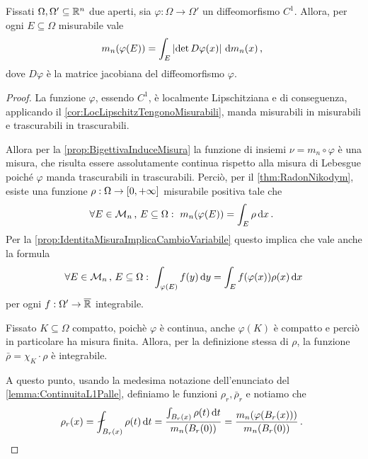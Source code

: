 \begin{lemma}\label{lemma:MisuraImmagine}
	Fissati $\Omega,\Omega'\subseteq\mathbb R^n$ due aperti, sia $\varphi:\Omega\to\Omega'$ un diffeomorfismo $C^1$.
	Allora, per ogni $E\subseteq \Omega$ misurabile vale
	\begin{equation*}
		m_n(\varphi(E))=\int_E\left\lvert \det D\varphi(x) \right\rvert \,\mathrm d m_n(x)\, \text{, }
	\end{equation*}
	dove $D\varphi$ è la matrice jacobiana del diffeomorfismo $\varphi$.
\end{lemma}
\begin{proof}
	La funzione $\varphi$, essendo $C^1$, è localmente Lipschitziana e di conseguenza, applicando il \cref{cor:LocLipschitzTengonoMisurabili}, manda misurabili in misurabili e trascurabili in trascurabili.
	
	Allora per la \cref{prop:BigettivaInduceMisura} la funzione di insiemi $\nu=m_n\circ \varphi$ è una misura, che risulta essere assolutamente continua rispetto alla misura di Lebesgue poiché $\varphi$ manda trascurabili in trascurabili.
	Perciò, per il \cref{thm:RadonNikodym}, esiste una funzione $\rho:\Omega\to[0,+\infty]$ misurabile positiva tale che
	\begin{equation*}
		\forall E\in \mathcal M_n\, \text{, } E\subseteq \Omega:\ m_n(\varphi(E))=\int_E \rho \,\mathrm d x \, \text{. }
	\end{equation*}
	Per la \cref{prop:IdentitaMisuraImplicaCambioVariabile} questo implica che vale anche la formula
	\begin{equation}\label{eq:CambioRadonNikodym}
		\forall E\in \mathcal M_n\, \text{, } E\subseteq\Omega:\ \int_{\varphi(E)} f(y)\,\mathrm d y = \int_{E} f(\varphi(x))\rho(x) \,\mathrm d x
	\end{equation}
	per ogni $f:\Omega'\to\overline{\mathbb R}$ integrabile.
	
	Fissato $K\subseteq\Omega$ compatto, poichè $\varphi$ è continua, anche $\varphi(K)$ è compatto e perciò in particolare ha misura finita.
	Allora, per la definizione stessa di $\rho$, la funzione $\bar\rho=\chi_K\cdot\rho$ è integrabile.
	
	A questo punto, usando la medesima notazione dell'enunciato del \cref{lemma:ContinuitaL1Palle}, definiamo le funzioni $\rho_r, \bar\rho_r$ e notiamo che
	\begin{equation*}
		\rho_r(x)=\aint_{B_r(x)}\rho(t)\de t=\frac{\int_{B_r(x)} \rho(t)\de t}{m_n(B_r(0))}=\frac{m_n(\varphi(B_r(x)))}{m_n(B_r(0))}\punto
	\end{equation*}
	

\end{proof}

